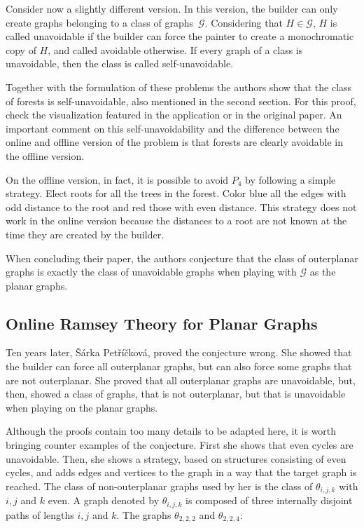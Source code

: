 Consider now a slightly different version. In this version, the builder can only create graphs belonging to a class of \mbox{graphs $\mathcal{G}$.} Considering that $H \in \mathcal{G}$, $H$ is called unavoidable if the builder can force the painter to create a monochromatic copy of $H$, and called avoidable otherwise. If every graph of a class is unavoidable, then the class is called self-unavoidable.

Together with the formulation of these problems the authors show\cite{1} that the class of forests is self-unavoidable, also mentioned in the second section. For this proof, check the visualization featured in the application or in the original paper. An important comment on this self-unavoidability and the difference between the online and offline version of the problem is that forests are clearly avoidable in the offline version.

On the offline version, in fact, it is possible to avoid $P_4$ by following a simple strategy. Elect roots for all the trees in the forest. Color blue all the edges with odd distance to the root and red those with even distance. This strategy does not work in the online version because the distances to a root are not known at the time they are created by the builder.

When concluding their paper, the authors conjecture that the class of outerplanar graphs is exactly the class of unavoidable graphs when playing with $\mathcal{G}$ as the planar graphs.

\subsection*{Online Ramsey Theory for Planar Graphs\cite{3}}

Ten years later, Šárka Petříčková\cite{3}, proved the conjecture wrong. She showed that the builder can force all outerplanar graphs, but can also force some graphs that are not outerplanar. She proved that all outerplanar graphs are unavoidable, but, then, showed a class of graphs, that is not outerplanar, but that is unavoidable when playing on the planar graphs.

Although the proofs contain too many details to be adapted here, it is worth bringing counter examples of the conjecture. First she shows that even cycles are unavoidable. Then, she shows a strategy, based on structures consisting of even cycles, and adds edges and vertices to the graph in a way that the target graph is reached. The class of non-outerplanar graphs used by her is the class of $\theta_{i,j,k}$ with $i, j$ and $k$ even. A graph denoted by $\theta_{i,j,k}$ is composed of three internally disjoint paths of lengths $i,j$ and $k$. The graphs $\theta_{2,2,2}$ and $\theta_{2,2,4}$:

